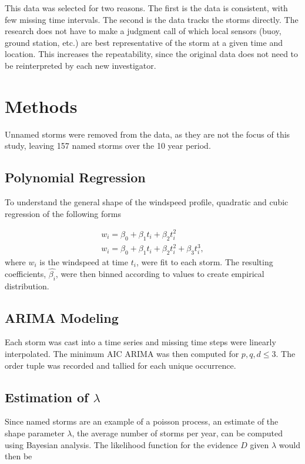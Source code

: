 \documentclass{article}
\begin{document}
	This data was selected for two reasons. The first is the data is consistent, with few missing time intervals. The second is the data tracks the storms directly. The research does not have to make a judgment call of which local sensors (buoy, ground station, etc.) are best representative of the storm at a given time and location. This increases the repeatability, since the original data does not need to be reinterpreted by each new investigator.

	\section{Methods}	 
	 Unnamed storms were removed from the data, as they are not the focus of this study, leaving 157 named storms over the 10 year period. 

	\subsection{Polynomial Regression}
	To understand the general shape of the windspeed profile, quadratic and cubic regression of the following forms
	
		\begin{align}
			w_i = \beta_0 + \beta_1 t_i + \beta_2 t_i^2\\
			w_i = \beta_0 + \beta_1 t_i + \beta_2 t_i^2 + \beta_3 t_i^3,
		\end{align}
	where $w_i$ is the windspeed at time $t_i$, were fit to each storm. The resulting coefficients, $\hat{\beta_i}$, were then binned 
according to values to create empirical distribution.

	\subsection{ARIMA Modeling}
	Each storm was cast into a time series and missing time steps were linearly interpolated. The minimum AIC ARIMA was then computed for $p, q, d \le 3$. The order tuple was recorded and tallied for each unique occurrence.

	\subsection{Estimation of $\lambda$}
	Since named storms are an example of a poisson process, an estimate of the shape parameter $\lambda$, the average number of storms per year, can be computed using Bayesian analysis. The likelihood function for the evidence $D$ given $\lambda$ would then be
	
\end{document}
